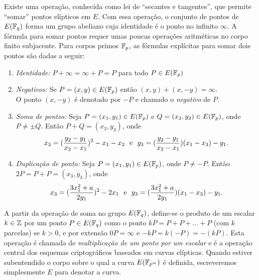 \documentclass{SBCbookchapter}
\begin{document}
\noindent  Existe uma  operação, conhecida  como lei  de  ``secantes e
tangentes'', que  permite ``somar'' pontos elípticos em  $E$. Com essa
operação, o conjunto  de pontos de $E(\mbox{${\mathbb F}$}_q)$ forma  um grupo abeliano
cuja identidade é o ponto no infinito {$\infty$}.  A fórmula para somar
pontos  requer  umas  poucas  operações aritméticas  no  corpo  finito
subjacente.  Para  corpos primos  $\mbox{${\mathbb F}$}_p$, as fórmulas  explícitas para
somar dois pontos são dadas a seguir:

\begin{enumerate}
\item {\it Identidade:} $P + {\infty} =  {\infty} + P = P$ para todo $P\in E(\mbox{${\mathbb F}$}_p)$
\item \emph{Negativos:} Se $P = (x,y) \in E(\mbox{${\mathbb F}$}_p)$ então $(x,y) + 
      (x,-y) = {\infty}$.\\
      O ponto $(x,-y)$ é denotado por $-P$ e chamado o {\it negativo} de $P$.
\item \emph{Soma de pontos:} Seja $P = (x_1,y_1)\in  E(\mbox{${\mathbb F}$}_p)$ e 
$Q = (x_2,y_2)\in  E(\mbox{${\mathbb F}$}_p)$, onde $P \neq \pm Q$. Então 
$P + Q = (x_3,y_3)$, onde 
\[ x_3 = (\frac{y_2-y_1}{x_2-x_1})^2 - x_1 - x_2\ \ {\rm{e}}\ \ 
   y_3 = (\frac{y_2-y_1}{x_2-x_1})(x_1-x_3)-y_1.\]
\item \emph{Duplicação de  ponto:} Seja $P = (x_1,y_1)\in  E(\mbox{${\mathbb F}$}_p)$, onde 
$P \neq -P$. Então 
$2P = P + P = (x_3,y_3)$, onde 
\[ x_3 = (\frac{3x_1^2+a}{2y_1})^2 - 2x_1\ \ {\rm{e}}\ \ 
   y_3 = (\frac{3x_1^2 + a}{2y_1})(x_1-x_3)-y_1.\]
\end{enumerate}

A partir da operação de  soma no grupo $E(\mbox{${\mathbb F}$}_q)$, define-se o produto
de um escalar $k \in \mbox{${\mathbb Z}$}$ por  um ponto $P \in E(\mbox{${\mathbb F}$}_q)$ como o ponto $
kP = P + P + \dots + P$  (com $k$ parcelas) se $k > 0$, e por extensão
$0P = {\infty}$  e $-kP = k(-P) = -(kP)$.  Esta  operação é chamada de
{\it multiplicação de um ponto por  um escalar} e é a operação central
dos esquemas criptográficos baseados em curvas elípticas. Quando estiver subentendido o corpo sobre o qual a curva $E(\mbox{${\mathbb F}$}_{p^m})$ é  definida, escreveremos simplesmente $E$ para denotar a curva.
\end{document}
